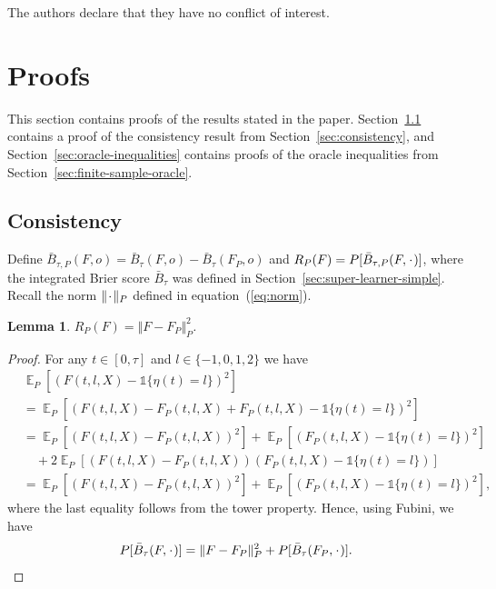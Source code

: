 \documentclass[a4paper,danish]{article}
\theoremstyle{plain} %
\numberwithin{theorem}{section}
\newtheorem{lemma}[theorem]{Lemma}
\theoremstyle{definition} %
\theoremstyle{remark}
\DeclareMathOperator{\E}{\mathbb{E}} %
\newcommand{\blank}{\makebox[1ex]{\textbf{$\cdot$}}}
\newcommand{\1}{\mathds{1}}
\begin{document}
The authors declare that they have no conflict of interest.




\appendix

\section{Proofs}
\label{sec:proofs}

This section contains proofs of the results stated in the
paper. Section~\ref{sec:consistency-proof} contains a proof of
the consistency result from Section~\ref{sec:consistency}, and
Section~\ref{sec:oracle-inequalities} contains proofs of the
oracle inequalities from
Section~\ref{sec:finite-sample-oracle}.

\subsection{Consistency}
\label{sec:consistency-proof}

Define
\( \bar{B}_{\tau,P}(F, o) = \bar{B}_{\tau}(F, o) -
\bar{B}_{\tau}(F_P, o) \) and
\( R_{P}(F) = P{[\bar{B}_{\tau,P}(F, \blank)]} \), where the
integrated Brier score \( \bar{B}_{\tau} \) was defined in
Section~\ref{sec:super-learner-simple}. Recall the norm
\( \Vert \blank \Vert_{P}\) defined in
equation~(\ref{eq:norm}).

\begin{lemma}
  \label{lemma:norm}
  \( R_{P}(F) = \Vert F - F_P \Vert_{P}^2 \).
\end{lemma}
\begin{proof}[Proof]
  For any \( t \in [0, \tau] \) and \( l\in \{-1,0,1,2\} \) we have
  \begin{align*}
    & \E_{P}{\left[ (F(t, l, X) - \1{\{\eta(t) = l \}})^2 \right]}
    \\
    & =    \E_{P}{\left[ (F(t, l, X) - F_P(t, l, X) + F_P(t, l, X) - \1{\{\eta(t) = l
      \}})^2 \right]}
    \\
    & =    \E_{P}{\left[ (F(t, l, X) - F_P(t, l, X))^2\right]}
      + \E_{P}{\left[ (F_P(t, l, X) - \1{\{\eta(t) = l \}})^2\right]}
    \\
    & \quad
      + 2\E_{P}{\left[ (F(t, l, X) - F_P(t, l, X))(F_P(t, l, X) - \1{\{\eta(t) = l
      \}})\right]}
    \\
    & =    \E_{P}{\left[ (F(t, l, X) - F_P(t, l, X))^2\right]}
      + \E_{P}{\left[ (F_P(t, l, X) - \1{\{\eta(t) = l \}})^2\right]},
  \end{align*}
  where the last equality follows from the tower property. Hence, using Fubini,
  we have
  \begin{equation*}
    P{[\bar{B}_{\tau}(F, \blank)]}
    = \Vert F - F_P \Vert_{P}^2 + P{[\bar{B}_{\tau}(F_P, \blank)]}.
  \end{equation*}
\end{proof}
\end{document}
